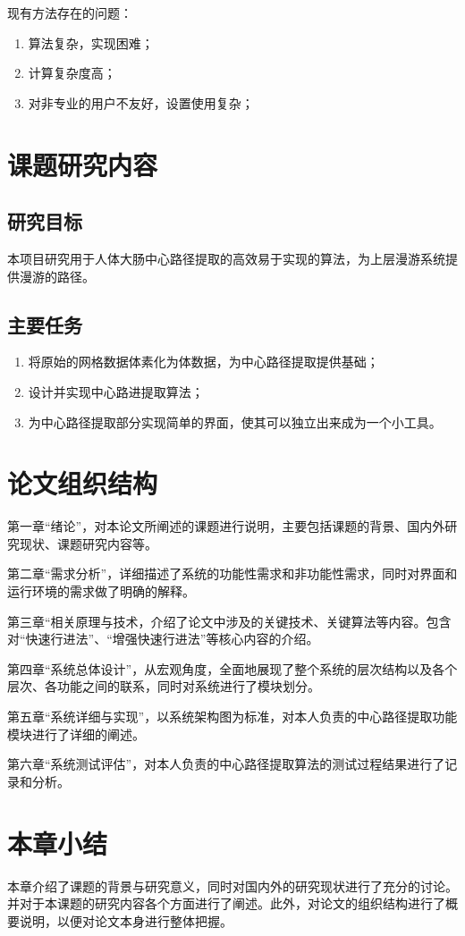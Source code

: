 现有方法存在的问题：
\begin{enumerate}
    \item 算法复杂，实现困难；
    \item 计算复杂度高；
　　\item 对非专业的用户不友好，设置使用复杂；
\end{enumerate}

\section{课题研究内容}
\subsection{研究目标}
本项目研究用于人体大肠中心路径提取的高效易于实现的算法，为上层漫游系统提供漫游的路径。

\subsection{主要任务}

\begin{enumerate}
    \item 将原始的网格数据体素化为体数据，为中心路径提取提供基础；
    \item 设计并实现中心路进提取算法；
    \item 为中心路径提取部分实现简单的界面，使其可以独立出来成为一个小工具。
\end{enumerate}

\section{论文组织结构}
第一章“绪论”，对本论文所阐述的课题进行说明，主要包括课题的背景、国内外研究现状、课题研究内容等。

第二章“需求分析”，详细描述了系统的功能性需求和非功能性需求，同时对界面和运行环境的需求做了明确的解释。

第三章“相关原理与技术，介绍了论文中涉及的关键技术、关键算法等内容。包含对“快速行进法”、“增强快速行进法”等核心内容的介绍。

第四章“系统总体设计”，从宏观角度，全面地展现了整个系统的层次结构以及各个层次、各功能之间的联系，同时对系统进行了模块划分。

第五章“系统详细与实现”，以系统架构图为标准，对本人负责的中心路径提取功能模块进行了详细的阐述。

第六章“系统测试评估”，对本人负责的中心路径提取算法的测试过程结果进行了记录和分析。

\section{本章小结}
本章介绍了课题的背景与研究意义，同时对国内外的研究现状进行了充分的讨论。并对于本课题的研究内容各个方面进行了阐述。此外，对论文的组织结构进行了概要说明，以便对论文本身进行整体把握。

